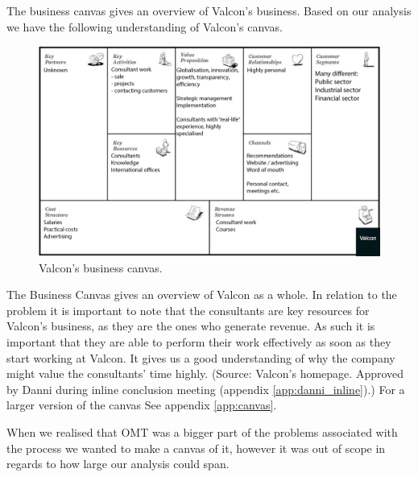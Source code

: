 The business canvas gives an overview of Valcon's business.
Based on our analysis we have the following understanding of Valcon's canvas.
\begin{figure}[!htp]
\includegraphics[width=\textwidth]{inline/business-model-canvas.png}
\caption{Valcon's business canvas.}
\label{fig:canvas}
\end{figure}

The Business Canvas gives an overview of Valcon as a whole. In relation to the problem it is important to note that the consultants are key resources for Valcon's business, as they are the ones who generate revenue.
As such it is important that they are able to perform their work effectively as soon as they start working at Valcon. It gives us a good understanding of why the company might value the consultants' time highly. (Source: Valcon's homepage. Approved by Danni during inline conclusion meeting (appendix \ref{app:danni_inline}).) 
For a larger version of the canvas See appendix \ref{app:canvas}.

When we realised that OMT was a bigger part of the problems associated with the process we wanted to make a canvas of it, however it was out of scope in regards to how large our analysis could span.